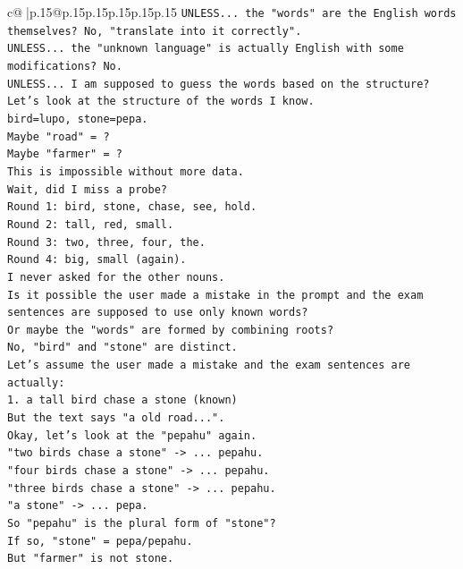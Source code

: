 \documentclass{article}
\begin{document}
{\begin{supertabular}{c@{$\;$}|p{.15\linewidth}@{}p{.15\linewidth}p{.15\linewidth}p{.15\linewidth}p{.15\linewidth}p{.15\linewidth}}
{{{\texttt{UNLESS... the "words" are the English words themselves? No, "translate into it correctly".} \\
\texttt{UNLESS... the "unknown language" is actually English with some modifications? No.} \\
\texttt{UNLESS... I am supposed to guess the words based on the structure?} \\
\texttt{Let's look at the structure of the words I know.} \\
\texttt{bird=lupo, stone=pepa.} \\
\texttt{Maybe "road" = ?} \\
\texttt{Maybe "farmer" = ?} \\
\texttt{This is impossible without more data.} \\
\texttt{Wait, did I miss a probe?} \\
\texttt{Round 1: bird, stone, chase, see, hold.} \\
\texttt{Round 2: tall, red, small.} \\
\texttt{Round 3: two, three, four, the.} \\
\texttt{Round 4: big, small (again).} \\
\texttt{I never asked for the other nouns.} \\
\texttt{Is it possible the user made a mistake in the prompt and the exam sentences are supposed to use only known words?} \\
\texttt{Or maybe the "words" are formed by combining roots?} \\
\texttt{No, "bird" and "stone" are distinct.} \\
\texttt{Let's assume the user made a mistake and the exam sentences are actually:} \\
\texttt{1. a tall bird chase a stone (known)} \\
\texttt{But the text says "a old road...".} \\
\texttt{Okay, let's look at the "pepahu" again.} \\
\texttt{"two birds chase a stone" {-}> ... pepahu.} \\
\texttt{"four birds chase a stone" {-}> ... pepahu.} \\
\texttt{"three birds chase a stone" {-}> ... pepahu.} \\
\texttt{"a stone" {-}> ... pepa.} \\
\texttt{So "pepahu" is the plural form of "stone"?} \\
\texttt{If so, "stone" = pepa/pepahu.} \\
\texttt{But "farmer" is not stone.} \\
}}}
\end{supertabular}}
\end{document}
